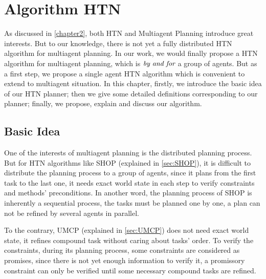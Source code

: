 \chapter{Algorithm HTN}
As discussed in \autoref{chapter2}, %
both HTN and Multiagent Planning introduce great interests. But to our knowledge, there is not yet a fully distributed HTN algorithm for multiagent planning. 
In our work, we would finally propose a HTN algorithm for multiagent planning, which is $\emph{by and for}$ a group of agents. But as a first step, we propose a single agent HTN algorithm which is convenient to extend to multiagent situation. In this chapter, firstly, we introduce the basic idea of our HTN planner; then we give some detailed definitions corresponding to our planner; finally, we propose, explain and discuss our algorithm.
%

\section{Basic Idea}
One of the interests of multiagent planning is the distributed planning process. But for HTN algorithms like SHOP (explained in \autoref{sec:SHOP}), it is difficult to distribute the planning process to a group of agents, since it plans from the first task to the last one, it needs exact world state in each step to verify constraints and methods’ preconditions. In another word, the planning process of SHOP is inherently a sequential process, the tasks must be planned one by one, a plan can not be refined by several agents in parallel.

To the contrary, UMCP (explained in \autoref{sec:UMCP}) does not need exact world state, it refines compound task without caring about tasks’ order. To verify the constraints, during its planning process, some constraints are considered as promises, since there is not yet enough information to verify it, a promissory constraint can only be verified until some necessary compound tasks are refined.

